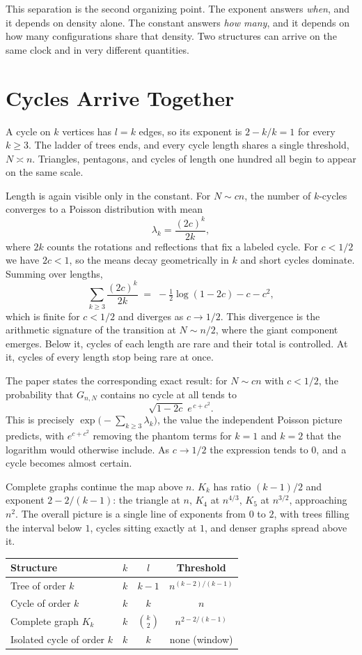 \documentclass[11pt]{article}
\begin{document}
This separation is the second organizing point. The exponent answers \emph{when}, and it depends on density alone. The constant answers \emph{how many}, and it depends on how many configurations share that density. Two structures can arrive on the same clock and in very different quantities.

\section{Cycles Arrive Together}

A cycle on $k$ vertices has $l=k$ edges, so its exponent is $2 - k/k = 1$ for every $k\ge 3$. The ladder of trees ends, and every cycle length shares a single threshold, $N\asymp n$. Triangles, pentagons, and cycles of length one hundred all begin to appear on the same scale.

Length is again visible only in the constant. For $N\sim cn$, the number of $k$-cycles converges to a Poisson distribution with mean
\[
\lambda_k = \frac{(2c)^k}{2k},
\]
where $2k$ counts the rotations and reflections that fix a labeled cycle. For $c<1/2$ we have $2c<1$, so the means decay geometrically in $k$ and short cycles dominate. Summing over lengths,
\[
\sum_{k\ge 3} \frac{(2c)^k}{2k} \;=\; -\tfrac12\log(1-2c) - c - c^2,
\]
which is finite for $c<1/2$ and diverges as $c\to 1/2$. This divergence is the arithmetic signature of the transition at $N\sim n/2$, where the giant component emerges. Below it, cycles of each length are rare and their total is controlled. At it, cycles of every length stop being rare at once.

The paper states the corresponding exact result: for $N\sim cn$ with $c<1/2$, the probability that $G_{n,N}$ contains no cycle at all tends to
\[
\sqrt{1-2c}\;e^{\,c+c^2}.
\]
This is precisely $\exp\!\big(-\sum_{k\ge3}\lambda_k\big)$, the value the independent Poisson picture predicts, with $e^{c+c^2}$ removing the phantom terms for $k=1$ and $k=2$ that the logarithm would otherwise include. As $c\to 1/2$ the expression tends to $0$, and a cycle becomes almost certain.

Complete graphs continue the map above $n$. $K_k$ has ratio $(k-1)/2$ and exponent $2 - 2/(k-1)$: the triangle at $n$, $K_4$ at $n^{4/3}$, $K_5$ at $n^{3/2}$, approaching $n^2$. The overall picture is a single line of exponents from $0$ to $2$, with trees filling the interval below $1$, cycles sitting exactly at $1$, and denser graphs spread above it.

\begin{center}
\begin{tabular}{@{}lccc@{}}
\toprule
Structure & $k$ & $l$ & Threshold \\
\midrule
Tree of order $k$ & $k$ & $k-1$ & $n^{(k-2)/(k-1)}$ \\
Cycle of order $k$ & $k$ & $k$ & $n$ \\
Complete graph $K_k$ & $k$ & $\binom{k}{2}$ & $n^{2-2/(k-1)}$ \\
Isolated cycle of order $k$ & $k$ & $k$ & none (window) \\
\bottomrule
\end{tabular}
\end{center}
\end{document}
